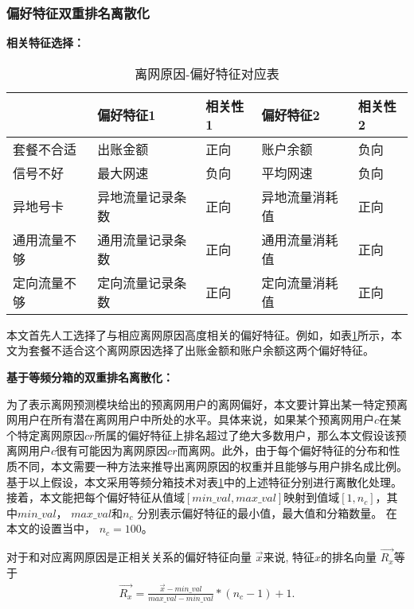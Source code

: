 \subsubsection{偏好特征双重排名离散化}
\textbf{相关特征选择：}\par

\begin{table}[htb]
	\centering
	\caption{离网原因-偏好特征对应表}
	\label{Table:Correlation-Feature}
	\begin{tabular}{lllll}
		\toprule
		\ & 偏好特征1 & 相关性1 & 偏好特征2 & 相关性2\\
		\midrule 
		\midrule
		套餐不合适 & 出账金额 & 正向 & 账户余额 & 负向  \\
		信号不好 & 最大网速  & 负向 & 平均网速  & 负向 \\
		异地号卡 & 异地流量记录条数 & 正向 & 异地流量消耗值 & 正向 \\
		通用流量不够 & 通用流量记录条数 & 正向 & 通用流量消耗值 & 正向 \\
		定向流量不够 & 定向流量记录条数 & 正向 & 定向流量消耗值 & 正向 \\
		\midrule 
		\bottomrule	
	\end{tabular}
\end{table}



本文首先人工选择了与相应离网原因高度相关的偏好特征。例如，如表\ref{Table:Correlation-Feature}所示，本文为套餐不适合这个离网原因选择了出账金额和账户余额这两个偏好特征。

\textbf{基于等频分箱的双重排名离散化：}\par
为了表示离网预测模块给出的预离网用户的离网偏好，本文要计算出某一特定预离网用户在所有潜在离网用户中所处的水平。具体来说，如果某个预离网用户$c$在某个特定离网原因$cr$所属的偏好特征上排名超过了绝大多数用户，那么本文假设该预离网用户$c$很有可能因为离网原因$cr$而离网。此外，由于每个偏好特征的分布和性质不同，本文需要一种方法来推导出离网原因的权重并且能够与用户排名成比例。基于以上假设，本文采用等频分箱技术对表\ref{Table:Correlation-Feature}中的上述特征分别进行离散化处理。接着，本文能把每个偏好特征从值域$[min\_val, max\_val]$映射到值域$[1, n_{c}]$，其中$min\_val$， $max\_val$和$n_{c}$ 分别表示偏好特征的最小值，最大值和分箱数量。 在本文的设置当中， $n_{c} = 100$。

对于和对应离网原因是正相关关系的偏好特征向量 $\vec{x}$来说, 特征$x$的排名向量 $\overrightarrow{R_x}$等于
\begin{equation}
	\begin{aligned}
		\overrightarrow{R_x} = \frac{\vec{x}-min\_val}{max\_val-min\_val}*(n_{c} - 1) + 1.
	\end{aligned}
	\label{Eq:Postive-Binning}
\end{equation}	

